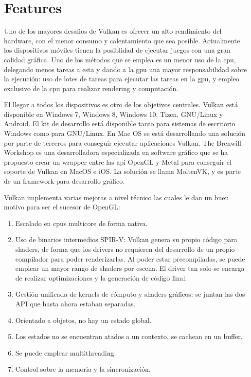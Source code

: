 \chapter{Features}
Uno de los mayores desafios de Vulkan es ofrecer un alto rendimiento del hardware, con el menor consumo y calentamiento
que sea posible. Actualmente los dispositivos móviles tienen la posiblidad de ejecutar juegos con una gran calidad
gráfica. Uno de los métodos que se emplea es un menor uso de la \gls{cpu}, delegando menos tareas a esta y dando a la
\gls{gpu} una mayor responsabilidad sobre la ejecución: uso de lotes de tareas para ejecutar las tareas en la
\gls{gpu}, y empleo exclusivo de la \gls{cpu} para realizar rendering y computación.

El llegar a todos los dispositivos es otro de los objetivos centrales. Vulkan está disponible en Windows 7, Windows 8,
Windows 10, Tizen, GNU/Linux y Android. El kit de desarrollo está disponible tanto para sistemas de escritorio Windows
como para GNU/Linux. En Mac OS se está desarrollando una solución por parte de terceros para conseguir ejecutar
aplicaciones Vulkan. The Brenwill Workshop es una desarrolladora especializada en software gráfico que se ha propuesto
crear un wrapper entre las \gls{api} OpenGL y Metal para conseguir el soporte de Vulkan en MacOS e iOS. La solución
se llama MoltenVK, y es parte de un framework para desarrollo gráfico.

Vulkan implementa varias mejoras a nivel técnico las cuales le dan un buen motivo para ser el sucesor de OpenGL:
\begin{enumerate}
    \item Escalado en \gls{cpu}s multicore de forma nativa.
    \item Uso de binarios intermedios SPIR-V: Vulkan genera su propio código para shaders, de forma que los drivers no
    requieren del desarrollo de un propio compilador para poder renderizarlas. Al poder estar precompiladas, se puede
    emplear un mayor rango de shaders por escena. El driver tan solo se encarga de realizar optimizaciones y la
    generación de código final.
    \item Gestión unificada de kernels de cómputo y shaders gráficos: se juntan las dos API que hasta ahora estaban
    separadas.
    \item Orientado a objetos, no hay un estado global.
    \item Los estados no se encuentran atados a un contexto, se cachean en un buffer.
    \item Se puede emplear multithreading.
    \item Control sobre la memoria y la sincronización.
\end{enumerate}

